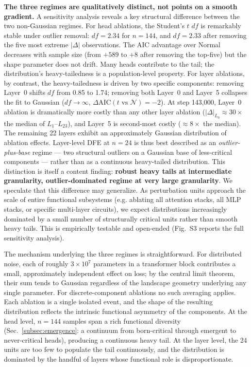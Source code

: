 \documentclass{article}
\begin{document}
\textbf{The three regimes are qualitatively distinct, not points on a smooth gradient.} A sensitivity analysis reveals a key structural difference between the two non-Gaussian regimes. For head ablations, the Student's $t$ $df$ is remarkably stable under outlier removal: $df = 2.34$ for $n = 144$, and $df = 2.33$ after removing the five most extreme $|\Delta|$ observations. The AIC advantage over Normal decreases with sample size (from $+589$ to $+8$ after removing the top-five) but the shape parameter does not drift. Many heads contribute to the tail; the distribution's heavy-tailedness is a population-level property. For layer ablations, by contrast, the heavy-tailedness is driven by two specific components: removing Layer~0 shifts $df$ from 0.85 to 1.74; removing both Layer~0 and Layer~5 collapses the fit to Gaussian ($df \to \infty$, $\Delta\text{AIC}(t \text{ vs } \mathcal{N}) = -2$). At step 143,000, Layer~0 ablation is dramatically more costly than any other layer ablation ($|\Delta|_{L_0} \approx 30\times$ the median of $L_1$--$L_{23}$), and Layer~5 is second-most costly ($\approx 8\times$ the median). The remaining 22 layers exhibit an approximately Gaussian distribution of ablation effects. Layer-level DFE at $n = 24$ is thus best described as an \emph{outlier-plus-base} regime --- two structural outliers on a Gaussian base of less-critical components --- rather than as a continuous heavy-tailed distribution. This distinction is itself a content finding: \textbf{robust heavy tails at intermediate granularity, outlier-dominated regime at very large granularity}. We speculate that this difference may generalize. As perturbation units approach the scale of entire functional subsystems (e.g. ablating all attention stacks, all MLP stacks, or specific multi-layer circuits), we expect distributions increasingly dominated by a small number of structurally critical units rather than smooth heavy tails. This is empirically testable and open-ended (Fig.~S3 reports the full sensitivity analysis).

The mechanism underlying the three regimes is straightforward. For distributed noise, each of roughly $3\!\times\!10^7$ parameters in a transformer block contributes a small, approximately independent effect on loss; by the central limit theorem, their sum tends to Gaussian regardless of the landscape geometry underlying any single parameter. For discrete-component ablations no such averaging applies. Each ablation is a single isolated event, and the shape of the resulting distribution reflects the intrinsic functional asymmetry of the components. At the head level, $n = 144$ samples span a rich functional diversity (Sec.~\ref{subsec:emergence}: a continuum from born-critical through emergent to never-critical heads), producing a continuous heavy tail. At the layer level, the 24 units are too few to populate the tail continuously, and the distribution is dominated by the handful of layers whose functional role is disproportionate.
\end{document}
